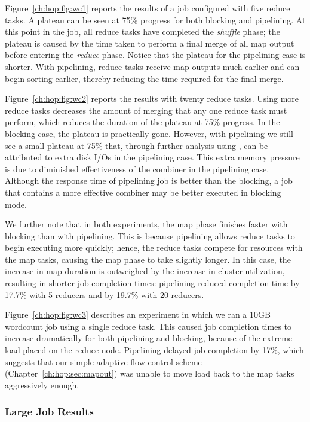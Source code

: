 Figure~\ref{ch:hop:fig:wc1} reports the results of a job configured with five
reduce tasks.  A plateau can be seen at 75\% progress for both blocking and
pipelining.  At this point in the job, all reduce tasks have completed the {\em
shuffle} phase; the plateau is caused by the time taken to perform a final
merge of all map output before entering the {\em reduce} phase.  Notice that
the plateau for the pipelining case is shorter.  With pipelining, reduce tasks
receive map outputs much earlier and can begin sorting earlier, thereby
reducing the time required for the final merge.

Figure~\ref{ch:hop:fig:wc2} reports the results with twenty reduce tasks.
Using more reduce tasks decreases the amount of merging that any one reduce
task must perform, which reduces the duration of the plateau at 75\% progress.
In the blocking case, the plateau is practically gone.  However, with
pipelining we still see a small plateau at 75\% that, through further analysis
using , can be attributed to extra disk I/Os in the pipelining case.
This extra memory pressure is due to diminished effectiveness of the combiner
in the pipelining case.  Although the response time of pipelining job is better
than the blocking, a job that contains a more effective combiner may be better
executed in blocking mode.

We further note that in both experiments, the map phase finishes faster with
blocking than with pipelining.  This is because pipelining allows reduce tasks
to begin executing more quickly; hence, the reduce tasks compete for resources
with the map tasks, causing the map phase to take slightly longer.  In this
case, the increase in map duration is outweighed by the increase in cluster
utilization, resulting in shorter job completion times: pipelining reduced
completion time by 17.7\% with 5 reducers and by 19.7\% with 20 reducers.

Figure~\ref{ch:hop:fig:wc3} describes an experiment in which we ran a 10GB
wordcount job using a single reduce task.  This caused job completion times to
increase dramatically for both pipelining and blocking, because of the extreme
load placed on the reduce node.  Pipelining delayed job completion by
\texttildelow{}17\%, which suggests that our simple adaptive flow control
scheme (Chapter~\ref{ch:hop:sec:mapout}) was unable to move load back to the
map tasks aggressively enough.

\subsubsection{Large Job Results}

